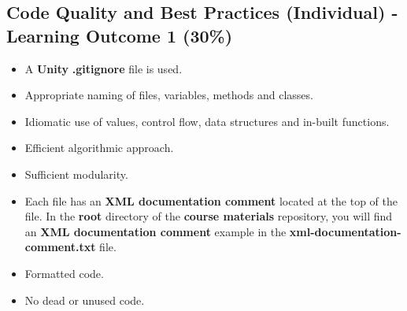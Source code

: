 \documentclass{article}
\begin{document}
\subsection*{Code Quality and Best Practices (Individual) - Learning Outcome 1 (30\%)}
\begin{itemize}
    \item A \textbf{Unity} \textbf{.gitignore} file is used. 
    \item Appropriate naming of files, variables, methods and classes.
    \item Idiomatic use of values, control flow, data structures and in-built functions.
    \item Efficient algorithmic approach.
    \item Sufficient modularity.
    \item Each file has an \textbf{XML documentation comment} located at the top of the file. In the \textbf{root} directory of the \textbf{course materials} repository, you will find an \textbf{XML documentation comment} example in the \textbf{xml-documentation-comment.txt} file.
    \item Formatted code.
    \item No dead or unused code.
\end{itemize} 
\end{document}
